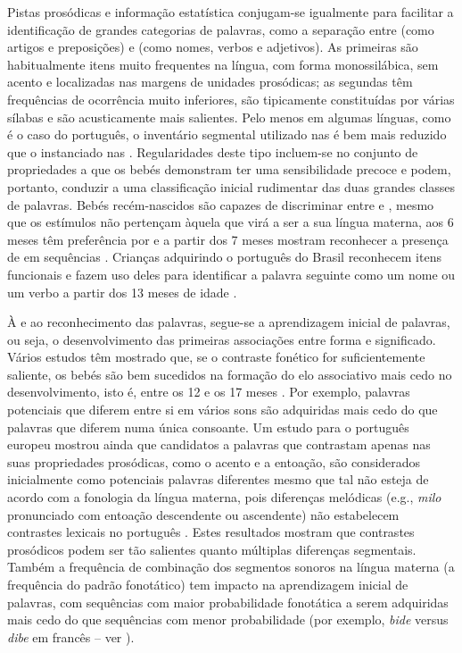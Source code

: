 \documentclass[output=paper]{LSP/langsci}
\begin{document}
Pistas prosódicas e informação estatística conjugam-se igualmente para facilitar a identificação de grandes categorias de palavras, como a separação entre  (como artigos e preposições) e  (como nomes, verbos e adjetivos). As primeiras são habitualmente itens muito frequentes na língua, com forma monossilábica, sem acento e localizadas nas margens de unidades prosódicas; as segundas têm frequências de ocorrência muito inferiores, são tipicamente constituídas por várias sílabas e são acusticamente mais salientes. Pelo menos em algumas línguas, como é o caso do português, o inventário segmental utilizado nas  é bem mais reduzido que o instanciado nas  \citep{vigario_etal2012}. Regularidades deste tipo incluem-se no conjunto de propriedades a que os bebés demonstram ter uma sensibilidade precoce e podem, portanto, conduzir a uma classificação inicial rudimentar das duas grandes classes de palavras. Bebés recém-nascidos são capazes de discriminar entre  e , mesmo que os estímulos não pertençam àquela que virá a ser a sua língua materna, aos 6 meses têm preferência por  e a partir dos 7 meses mostram reconhecer a presença de  em sequências \citep{gervainmehler2010}. Crianças adquirindo o português do Brasil reconhecem itens funcionais e fazem uso deles para identificar a palavra seguinte como um nome ou um verbo a partir dos 13 meses de idade \citep{namecorrea2003,name_etal2015}.

À  e ao reconhecimento das palavras, segue-se a aprendizagem inicial de palavras, ou seja, o desenvolvimento das primeiras associações entre forma e significado. Vários estudos têm mostrado que, se o contraste fonético for suficientemente saliente, os bebés são bem sucedidos na formação do elo associativo mais cedo no desenvolvimento, isto é, entre os 12 e os 17 meses \citep{gervainmehler2010}. Por exemplo, palavras potenciais que diferem entre si em vários sons são adquiridas mais cedo do que palavras que diferem numa única consoante. Um estudo para o português europeu mostrou ainda que candidatos a palavras que contrastam apenas nas suas propriedades prosódicas, como o acento e a entoação, são considerados inicialmente como potenciais palavras diferentes mesmo que tal não esteja de acordo com a fonologia da língua materna, pois diferenças melódicas (e.g., \textit{milo} pronunciado com entoação descendente ou ascendente) não estabelecem contrastes lexicais no português \citep{frota_etal2012}.  Estes resultados mostram que contrastes prosódicos podem ser tão salientes quanto múltiplas diferenças segmentais. Também a frequência de combinação dos segmentos sonoros na língua materna (a frequência do padrão fonotático) tem impacto na aprendizagem inicial de palavras, com sequências com maior probabilidade fonotática a serem adquiridas mais cedo do que sequências com menor probabilidade (por exemplo, \textit{bide} versus \textit{dibe} em francês -- ver \citealt{gonzalezgomez_etal2013}).
\end{document}
